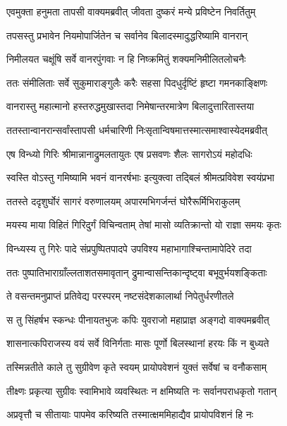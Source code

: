\twolineshloka
{एवमुक्ता हनुमता तापसी वाक्यमब्रवीत्}
{जीवता दुष्करं मन्ये प्रविष्टेन निवर्तितुम्} %

\twolineshloka
{तपसस्तु प्रभावेन नियमोपार्जितेन च}
{सर्वानेव बिलादस्मादुद्धरिष्यामि वानरान्} %

\twolineshloka
{निमीलयत चक्षूंषि सर्वे वानरपुंगवाः}
{न हि निष्क्रमितुं शक्यमनिमीलितलोचनैः} %

\twolineshloka
{ततः संमीलिताः सर्वे सुकुमाराङ्गुलैः करैः}
{सहसा पिदधुर्दृष्टिं हृष्टा गमनकाङ्क्षिणः} %

\twolineshloka
{वानरास्तु महात्मानो हस्तरुद्धमुखास्तदा}
{निमेषान्तरमात्रेण बिलादुत्तारितास्तया} %

\twolineshloka
{ततस्तान्वानरान्सर्वांस्तापसी धर्मचारिणी}
{निःसृतान्विषमात्तस्मात्समाश्वास्येदमब्रवीत्} %

\twolineshloka
{एष विन्ध्यो गिरिः श्रीमान्नानाद्रुमलतायुतः}
{एष प्रसवणः शैलः सागरोऽयं महोदधिः} %

\twolineshloka
{स्वस्ति वोऽस्तु गमिष्यामि भवनं वानरर्षभाः}
{इत्युक्त्वा तद्बिलं श्रीमत्प्रविवेश स्वयंप्रभा} %

\twolineshloka
{ततस्ते ददृशुर्घोरं सागरं वरुणालयम्}
{अपारमभिगर्जन्तं घोरैरूर्मिभिराकुलम्} %

\twolineshloka
{मयस्य माया विहितं गिरिदुर्गं विचिन्वताम्}
{तेषां मासो व्यतिक्रान्तो यो राज्ञा समयः कृतः} %

\twolineshloka
{विन्ध्यस्य तु गिरेः पादे संप्रपुष्पितपादपे}
{उपविश्य महाभागाश्चिन्तामापेदिरे तदा} %

\twolineshloka
{ततः पुष्पातिभाराग्राँल्लताशतसमावृतान्}
{द्रुमान्वासन्तिकान्दृष्ट्वा बभूवुर्भयशङ्किताः} %

\twolineshloka
{ते वसन्तमनुप्राप्तं प्रतिवेद्य परस्परम्}
{नष्टसंदेशकालार्था निपेतुर्धरणीतले} %

\twolineshloka
{स तु सिंहर्षभ स्कन्धः पीनायतभुजः कपिः}
{युवराजो महाप्राज्ञ अङ्गदो वाक्यमब्रवीत्} %

\twolineshloka
{शासनात्कपिराजस्य वयं सर्वे विनिर्गताः}
{मासः पूर्णो बिलस्थानां हरयः किं न बुध्यते} %

\twolineshloka
{तस्मिन्नतीते काले तु सुग्रीवेण कृते स्वयम्}
{प्रायोपवेशनं युक्तं सर्वेषां च वनौकसाम्} %

\twolineshloka
{तीक्ष्णः प्रकृत्या सुग्रीवः स्वामिभावे व्यवस्थितः}
{न क्षमिष्यति नः सर्वानपराधकृतो गतान्} %

\twolineshloka
{अप्रवृत्तौ च सीतायाः पापमेव करिष्यति}
{तस्मात्क्षममिहाद्यैव प्रायोपविशनं हि नः} %

